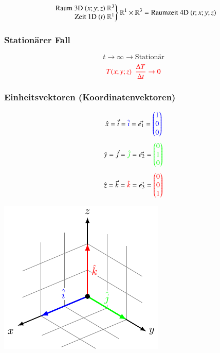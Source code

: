 $$\left.\begin{array}{r@{}}
    \text{Raum 3D ${(x;y;z)}$ }\rreal^3\\
    \text{Zeit 1D ${(t)}$ }\rreal^1
\end{array}\right\rbrace \rreal^{1}\times \rreal^3 = \text{Raumzeit 4D} \text{ } (t;x;y;z)$$

\subsubsection{Stationärer Fall}
$${t \rightarrow \infty \rightarrow \text{Stationär}}$$
$${{\color{red}T(x;y;z) \enspace\frac{\Delta{T}}{\Delta{t}} \rightarrow 0 }}$$


\subsubsection{Einheitsvektoren (Koordinatenvektoren)}

\begin{minipage}[c]{0.48\columnwidth}
    $$\hat{x}=\vec{i}={\color{blue}\hat{i}}=\vec{{e}_1}=
{\color{blue}\begin{pmatrix}
    1 \\
    0 \\
    0
\end{pmatrix}}$$
$$\hat{y}=\vec{j}={\color{green}\hat{j}}=\vec{{e}_2}=
{\color{green}\begin{pmatrix}
    0 \\
    1 \\
    0
\end{pmatrix}}$$
$$\hat{z}=\vec{k}={\color{red}\hat{k}}=\vec{{e}_3}=
{\color{red}\begin{pmatrix}
    0 \\
    0 \\
    1
\end{pmatrix}}$$
\end{minipage}
\hfill
\begin{minipage}[c]{0.48\columnwidth}
    \includegraphics[width=\columnwidth]{tikz/einheitsvektoren.pdf}
\end{minipage}

